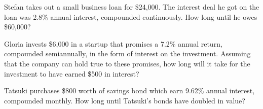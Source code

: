 \documentclass[11pt,letterpaper]{article}
\begin{document}
\newpage



 Stefan takes out a small business loan for \$24,000. The interest deal he got on the loan was 2.8\% annual interest, compounded continuously. How long until he owes \$60,000?



\newpage



 Gloria invests \$6,000 in a startup that promises a 7.2\% annual return, compounded semiannually, in the form of interest on the investment. Assuming that the company can hold true to these promises, how long will it take for the investment to have earned \$500 in interest?



\newpage



 Tatsuki purchases \$800 worth of savings bond which earn 9.62\% annual interest, compounded monthly. How long until Tatsuki's bonds have doubled in value?
\end{document}
